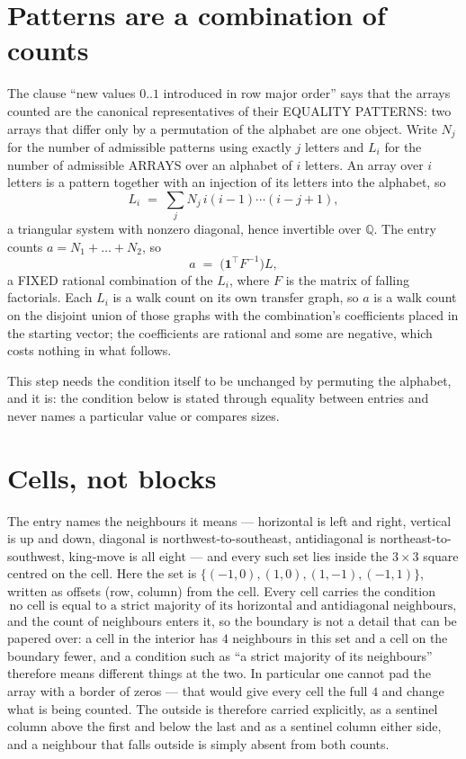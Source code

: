 \documentclass[11pt,a4paper]{article}
\theoremstyle{plain}
\theoremstyle{definition}
\begin{document}
\section{Patterns are a combination of counts}

The clause ``new values $0..1$ introduced in row major order'' says that the arrays
counted are the canonical representatives of their EQUALITY PATTERNS: two arrays that differ
only by a permutation of the alphabet are one object. Write $N_j$ for the number of admissible
patterns using exactly $j$ letters and $L_i$ for the number of admissible ARRAYS over an
alphabet of $i$ letters. An array over $i$ letters is a pattern together with an injection of
its letters into the alphabet, so
\[
L_i\;=\;\sum_{j}N_j\,i(i-1)\cdots(i-j+1),
\]
a triangular system with nonzero diagonal, hence invertible over $\mathbb{Q}$. The entry
counts $a=N_1+\dots+N_{2}$, so
\[
a\;=\;\bigl(\mathbf{1}^{\!\top}F^{-1}\bigr)L ,
\]
a FIXED rational combination of the $L_i$, where $F$ is the matrix of falling factorials.
Each $L_i$ is a walk count on its own transfer graph, so $a$ is a walk count on the disjoint
union of those graphs with the combination's coefficients placed in the starting vector; the
coefficients are rational and some are negative, which costs nothing in what follows.

This step needs the condition itself to be unchanged by permuting the alphabet, and it is:
the condition below is stated through equality between entries and never names a particular
value or compares sizes.

\section{Cells, not blocks}

The entry names the neighbours it means --- horizontal is left and right, vertical is up and
down, diagonal is northwest-to-southeast, antidiagonal is northeast-to-southwest, king-move is
all eight --- and every such set lies inside the $3\times3$ square centred on the cell. Here
the set is $\{(-1,0), (1,0), (1,-1), (-1,1)\}$, written as offsets (row, column) from the cell. Every cell carries
the condition
\[
\text{no cell is equal to a strict majority of its horizontal and antidiagonal neighbours},
\]
and the count of neighbours enters it, so the boundary is not a detail that can be papered
over: a cell in the interior has $4$ neighbours in this set and a cell on the boundary
fewer, and a condition such as ``a strict majority of its neighbours'' therefore means
different things at the two. In particular one cannot pad the array with a border of zeros ---
that would give every cell the full $4$ and change what is being counted. The outside is
therefore carried
explicitly, as a sentinel column above the first and below the last and as a sentinel column
either side, and a neighbour that falls outside is simply absent from both counts.
\end{document}
